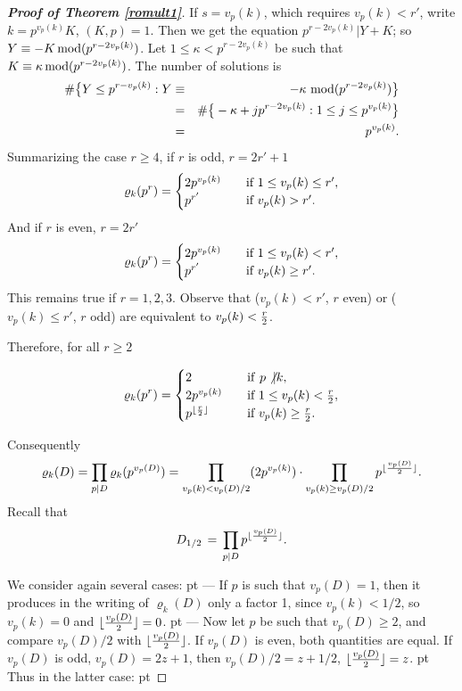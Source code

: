 \documentclass[11pt,draft,reqno]{amsart}
\theoremstyle{definition}
\theoremstyle{remarks}
\numberwithin{equation}{section}
\def \k{{\kappa}}
\begin{document}
\begin{proof}[\bf Proof of Theorem \ref{romult1}]
If $s= v_p(k) $, which requires $v_p(k)<r'$, write $k=p^{v_p(k)}K$, $(K,p)=1$. Then
we get the equation $p^{r-2v_p(k)}|   Y +K $; so  $Y  
\equiv -K \, {\rm mod}(p^{r-2v_p(k)})$.  
  Let $1\le \kappa<p^{r-2v_p(k)}$ be such that $K  \equiv \kappa\, {\rm mod}(p^{r-2v_p(k)})$.
The number of solutions is
\begin{eqnarray*} \#\big\{Y\le p^{r-v_p(k)}:    Y   &\equiv& -\k \  {\rm mod}(p^{r-2v_p(k)})\big\}
\cr &=&\#\big\{  -\kappa +jp^{r-2v_p(k)}:  1\le j\le p^{v_p(k)}\big\}
\cr &=&p^{v_p(k)}.
\end{eqnarray*}
  \vskip 7pt
 Summarizing the case $r\ge 4$, if $r$ is odd, $r=2r'+1$ 
\begin{equation}     \varrho_k(p^r) = \begin{cases}   2p^{v_p(k)} & \quad\hbox{\rm if   $1\le v_p(k)\le r'$},
   \cr 
        p^{r'} & \quad\hbox{\rm if   $v_p(k)> r'$}.
   \end{cases}
\end{equation}
And if $r$ is even, $r=2r'$  
\begin{equation}       \varrho_k(p^r) =  \begin{cases}    
   2p^{v_p(k)} & \quad\hbox{\rm if  $1\le v_p(k)< r'$},
   \cr
 p^{r'} & \quad\hbox{\rm if   $v_p(k)\ge r'$} .
\end{cases}
\end{equation}
This remains true if $r=1,2,3$. Observe that ($v_p(k)< r'$, $r$ even) or ($v_p(k)\le  r'$, $r$ odd) are equivalent to $v_p(k)<{r\over
2}$.  
\smallskip\par Therefore, for
all $r\ge 2$ 
 
\begin{equation}        \varrho_k(p^r) =  \begin{cases}    2  & \quad {\rm if}  \   p\not| k  ,
   \cr  2p^{  v_p(k)} & \quad\hbox{\rm if}\  1\le v_p(k)<{r\over
2} ,
   \cr 
        p^{\lfloor{r\over
2}\rfloor}   \ & \quad\hbox{\rm if} \  v_p(k)\ge {r\over
2} .
     \end{cases}
\end{equation}

Consequently \begin{equation} \label{valro}\varrho_k(D)= \prod_{p|D  }\varrho_k(p^{  v_p(D) })=  \prod_{ v_p(k)<{v_p(D)/
2}}(2p^{v_p(k)})\cdot\prod_{   v_p(k)\ge {v_p(D)/
2} }  p^{\lfloor{v_p(D)\over
2}\rfloor} .
\end{equation} 
Recall that 
$$  D_{1/2} \,=\,\prod_{p|D} p^{\lfloor {v_p(D)\over 2}\rfloor }.$$

We consider again several cases:
 pt 
--- If $p$ is such that $v_p(D)=1$, then it produces in the writing of $\varrho_k(D)$ only a factor 1, since $v_p(k)<1/2$, so $v_p(k)=0$   and $\lfloor{v_p(D)\over
2}\rfloor=0$. 
 pt 
--- Now let $p$ be such that $v_p(D)\ge 2$, and compare $v_p(D)/2$ with $\lfloor{v_p(D)\over
2}\rfloor$. If $v_p(D)$ is even, both quantities are equal. If $v_p(D)$ is odd, $v_p(D)= 2z+1$, then 
$v_p(D)/2=z + 1/2$,  
$\lfloor{v_p(D)\over
2}\rfloor= z$. 
 pt
Thus in the latter case:
 pt
 

\end{proof}
\end{document}
